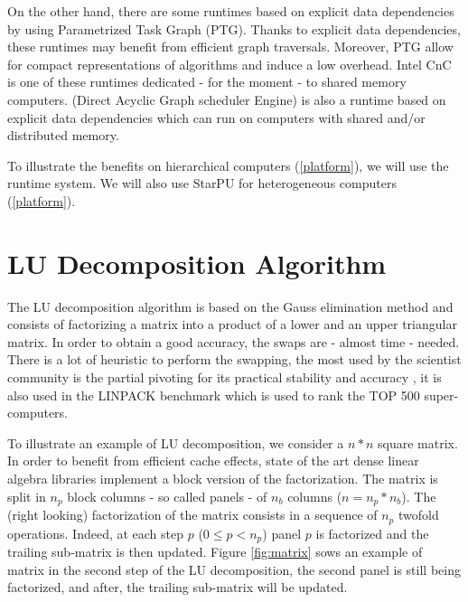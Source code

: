 On the other hand, there are some runtimes based on explicit data dependencies by using Parametrized Task Graph (PTG).
Thanks to explicit data dependencies, these runtimes may benefit from efficient graph traversals. Moreover, PTG allow for compact representations of algorithms and induce a low overhead. Intel CnC is one of these runtimes dedicated - for the moment - to shared memory computers. \dague (Direct Acyclic Graph scheduler Engine) is also a runtime based on explicit data dependencies which can run on computers with shared and/or distributed memory.

To illustrate the benefits on hierarchical computers (\ref{platform}), we will use the \dague runtime system. We will also use StarPU for heterogeneous computers (\ref{platform}).

\section{LU Decomposition Algorithm}\label{lu_algo}
The LU decomposition algorithm is based on the Gauss elimination method and consists of factorizing a matrix into a product of a lower and an upper triangular matrix. In order to obtain a good accuracy, the swaps are - almost time - needed. There is a lot of heuristic to perform the swapping, the most used by the scientist community is the partial pivoting for its practical stability and accuracy \cite{Hig02}, it is also used in the LINPACK benchmark which is used to rank the TOP 500 super-computers.

To illustrate an example of LU decomposition, we consider a $n*n$ square matrix. In order to benefit from efficient cache effects, state of the art dense linear algebra libraries implement a block version of the factorization. The matrix is split in $n_p$ block columns - so called panels - of $n_b$ columns ($n = n_p * n_b$). The (right looking) factorization of the matrix consists in a sequence of $n_p$ twofold operations. Indeed, at each step $p$ ($0 \leq p < n_p$) panel $p$ is factorized and the trailing sub-matrix is then updated. Figure \ref{fig:matrix} sows an example of matrix in the second step of the LU decomposition, the second panel is still being factorized, and after, the trailing sub-matrix will be updated.

